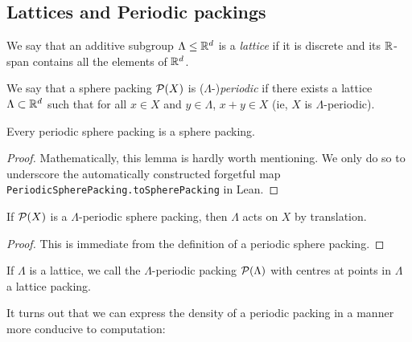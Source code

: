 \subsection{Lattices and Periodic packings}

\begin{definition}\label{IsZlattice}\leanok
  We say that an additive subgroup $\Lambda \leq \mathbb{R}^d$ is a \emph{lattice} if it is discrete and its $\mathbb{R}$-span contains all the elements of $\mathbb{R}^d$.
\end{definition}

\begin{definition}\label{PeriodicSpherePacking}\leanok
  We say that a sphere packing $\mathcal{P}(X)$ is ($\Lambda$-)\emph{periodic} if there exists a lattice $\Lambda \subset \mathbb{R}^d$ such that for all $x \in X$ and $y \in \Lambda$, $x + y \in X$ (ie, $X$ is $\Lambda$-periodic).
\end{definition}

\begin{lemma}\label{PeriodicSpherePacking.toSpherePacking}\leanok
  Every periodic sphere packing is a sphere packing.
\end{lemma}
\begin{proof}
  Mathematically, this lemma is hardly worth mentioning. We only do so to underscore the automatically constructed forgetful map \verb|PeriodicSpherePacking.toSpherePacking| in Lean.
\end{proof}

\begin{lemma}\label{PeriodicSpherePacking.instAddAction}\leanok
  If $\mathcal{P}(X)$ is a $\Lambda$-periodic sphere packing, then $\Lambda$ acts on $X$ by translation.
\end{lemma}
\begin{proof}\leanok
  This is immediate from the definition of a periodic sphere packing.
\end{proof}

\begin{definition}
  If $\Lambda$ is a lattice, we call the $\Lambda$-periodic packing $\mathcal{P}(\Lambda)$ with centres at points in $\Lambda$ a lattice packing.
\end{definition}

It turns out that we can express the density of a periodic packing in a manner more conducive to computation:

